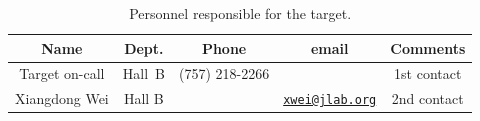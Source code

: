 \begin{table}[!htb]
\centering
\begin{tabular}{|c|c|c|c|c|} \hline
Name&Dept.&Phone&email&Comments \\ \hline
Target on-call & Hall~B& (757) 218-2266&& 1st contact  \\ \hline
Xiangdong Wei & Hall B & &\href{mailto:xwei@jlab.org}{\nolinkurl{xwei@jlab.org}}  &2nd contact \\ \hline
 \end{tabular}
\caption{Personnel responsible for the target.} 
\label{tb:vacuum}
\end{table}





